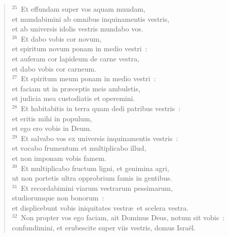 \begin{flushleft}
\begin{verse}
${}^{25}$~Et effundam super vos aquam mundam,\\ et mundabimini ab omnibus inquinamentis vestris,\\ et ab universis idolis vestris mundabo vos.\\
${}^{26}$~Et dabo vobis cor novum,\\ et spiritum novum ponam in medio vestri~:\\ et auferam cor lapideum de carne vestra,\\ et dabo vobis cor carneum.\\
${}^{27}$~Et spiritum meum ponam in medio vestri~:\\ et faciam ut in pr\ae ceptis meis ambuletis,\\ et judicia mea custodiatis et operemini.\\
${}^{28}$~Et habitabitis in terra quam dedi patribus vestris~:\\ et eritis mihi in populum,\\ et ego ero vobis in Deum.\\
${}^{29}$~Et salvabo vos ex universis inquinamentis vestris~:\\ et vocabo frumentum et multiplicabo illud,\\ et non imponam vobis famem.\\
${}^{30}$~Et multiplicabo fructum ligni, et genimina agri,\\ ut non portetis ultra opprobrium famis in gentibus.\\
${}^{31}$~Et recordabimini viarum vestrarum pessimarum,\\ studiorumque non bonorum~:\\ et displicebunt vobis iniquitates vestr\ae\ et scelera vestra.\\
${}^{32}$~Non propter vos ego faciam, ait Dominus Deus, notum sit vobis~:\\ confundimini, et erubescite super viis vestris, domus Isra\"el.\end{verse}\end{flushleft}


